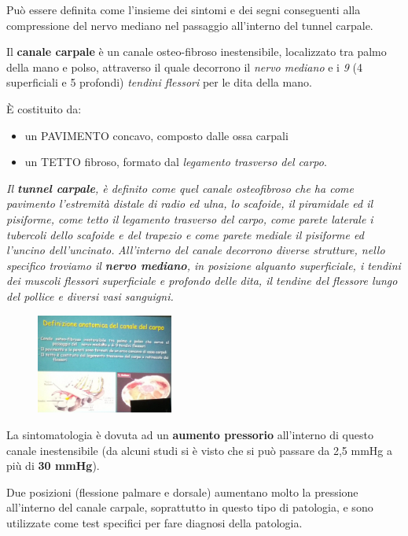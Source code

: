 Può essere definita come l'insieme dei sintomi e dei segni conseguenti alla compressione del nervo mediano nel passaggio all'interno del tunnel carpale.

Il \textbf{canale carpale} è un canale osteo-fibroso inestensibile, localizzato tra palmo della mano e polso, attraverso il quale decorrono il \emph{nervo mediano} e i \emph{9} (4 superficiali e 5 profondi) \emph{tendini flessori} per le dita della mano.

È costituito da:

\begin{itemize}
\item
  un PAVIMENTO concavo, composto dalle ossa carpali
\item
  un TETTO fibroso, formato dal \emph{legamento trasverso del carpo}.
\end{itemize}

\emph{Il \textbf{\emph{tunnel carpale}}, è definito come quel canale osteofibroso che ha come pavimento l'estremità distale di radio ed ulna, lo scafoide, il piramidale ed il pisiforme, come tetto il legamento trasverso del carpo, come parete laterale i tubercoli dello scafoide e del trapezio e come parete mediale il pisiforme ed l'uncino dell'uncinato.} \emph{All'interno del canale decorrono diverse strutture, nello specifico troviamo il \textbf{\emph{nervo mediano}}, in posizione alquanto superficiale, i \emph{tendini dei muscoli flessori
superficiale e profondo delle dita}, il \emph{tendine del flessore lungo del pollice} e diversi vasi sanguigni.}

\begin{figure}[!ht]
\centering
\includegraphics[width=0.4\textwidth]{006/image1.jpeg}
\end{figure}

La sintomatologia è dovuta ad un \textbf{aumento pressorio} all'interno di questo canale inestensibile (da alcuni studi si è visto che si può passare da 2,5 mmHg a più di \textbf{30 mmHg}).

Due posizioni (flessione palmare e dorsale) aumentano molto la pressione all'interno del canale carpale, soprattutto in questo tipo di patologia, e sono utilizzate come test specifici per fare diagnosi della patologia.

